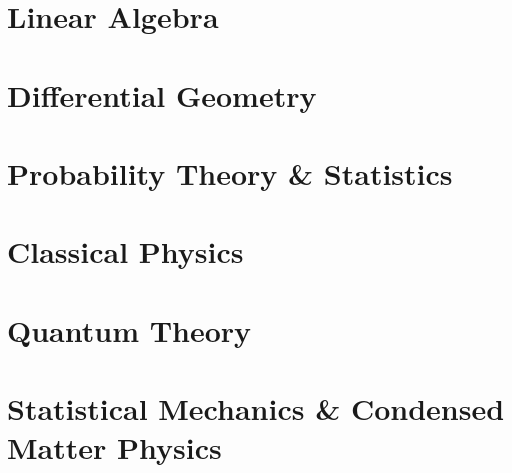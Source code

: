 \documentclass[12pt, a4paper]{report}
\begin{document}
\part{Linear Algebra}








\part{Differential Geometry}\label{part:diffgeom}

















\part{Probability Theory \& Statistics}









\part{Classical Physics}





\part{Quantum Theory}







\part{Statistical Mechanics \& Condensed Matter Physics}




\end{document}
